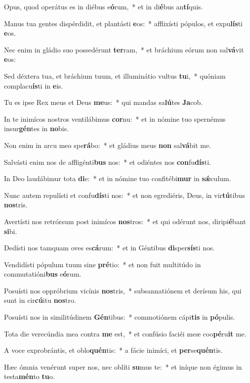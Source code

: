 \item Opus, quod operátus es in diébus e\textbf{ó}rum,~* et in di\textbf{é}bus an\textbf{tí}quis.
\item Manus tua gentes dispérdidit, et plantásti \textbf{e}os:~* afflixísti pópulos, et expu\textbf{lís}ti \textbf{e}os.
\item Nec enim in gládio suo possedérunt \textbf{ter}ram,~* et bráchium eórum non sal\textbf{vá}vit \textbf{e}os:
\item Sed déxtera tua, et bráchium tuum, et illuminátio vultus \textbf{tu}i,~* quóniam complacu\textbf{ís}ti in \textbf{e}is.
\item Tu es ipse Rex meus et Deus \textbf{me}us:~* qui mandas sa\textbf{lú}tes \textbf{Ja}cob.
\item In te inimícos nostros ventilábimus \textbf{cor}nu:~* et in nómine tuo spernémus insur\textbf{gén}tes in \textbf{no}bis.
\item Non enim in arcu meo spe\textbf{rá}bo:~* et gládius meus \textbf{non} sal\textbf{vá}bit me.
\item Salvásti enim nos de affligénti\textbf{bus} nos:~* et odiéntes nos \textbf{con}fu\textbf{dís}ti.
\item In Deo laudábimur tota \textbf{di}e:~* et in nómine tuo confitébi\textbf{mur} in \textbf{sǽ}culum.
\item Nunc autem repulísti et confu\textbf{dís}ti nos:~* et non egrediéris, Deus, in vir\textbf{tú}tibus \textbf{nos}tris.
\item Avertísti nos retrórsum post inimícos \textbf{nos}tros:~* et qui odérunt nos, diripi\textbf{é}bant \textbf{si}bi.
\item Dedísti nos tamquam oves es\textbf{cá}rum:~* et in Géntibus \textbf{di}sper\textbf{sís}ti nos.
\item Vendidísti pópulum tuum sine \textbf{pré}tio:~* et non fuit multitúdo in commutatióni\textbf{bus} e\textbf{ó}rum.
\item Posuísti nos oppróbrium vicínis \textbf{nos}tris,~* subsannatiónem et derísum his, qui sunt in cir\textbf{cú}itu \textbf{nos}tro.
\item Posuísti nos in similitúdinem \textbf{Gén}tibus:~* commotiónem cápi\textbf{tis} in \textbf{pó}pulis.
\item Tota die verecúndia mea contra \textbf{me} est,~* et confúsio faciéi meæ coo\textbf{pé}ru\textbf{it} me.
\item A voce exprobrántis, et oblo\textbf{quén}tis:~* a fácie inimíci, et \textbf{per}se\textbf{quén}tis.
\item Hæc ómnia venérunt super nos, nec oblíti \textbf{su}mus te:~* et iníque non égimus in testa\textbf{mén}to \textbf{tu}o.

